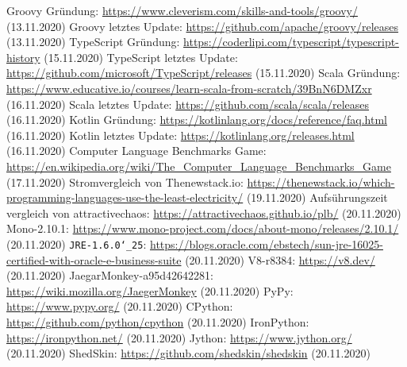 \documentclass[ngerman]{article}
\begin{document}
\begin{thebibliography}{9}
        Groovy Gründung: \url{https://www.cleverism.com/skills-and-tools/groovy/} (13.11.2020)
        Groovy letztes Update: \url{https://github.com/apache/groovy/releases} (13.11.2020)
        TypeScript Gründung: \url{https://coderlipi.com/typescript/typescript-history} (15.11.2020)
        TypeScript letztes Update: \url{https://github.com/microsoft/TypeScript/releases} (15.11.2020)
        Scala Gründung: \url{https://www.educative.io/courses/learn-scala-from-scratch/39BnN6DMZxr} (16.11.2020)
        Scala letztes Update: \url{https://github.com/scala/scala/releases} (16.11.2020)
        Kotlin Gründung: \url{https://kotlinlang.org/docs/reference/faq.html} (16.11.2020)
        Kotlin letztes Update: \url{https://kotlinlang.org/releases.html} (16.11.2020)
        Computer Language Benchmarks Game: \url{https://en.wikipedia.org/wiki/The_Computer_Language_Benchmarks_Game} (17.11.2020)
        Stromvergleich von Thenewstack.io: \url{https://thenewstack.io/which-programming-languages-use-the-least-electricity/} (19.11.2020)
        Aufsührungszeit vergleich von attractivechaos: \url{https://attractivechaos.github.io/plb/} (20.11.2020)
        Mono-2.10.1: \url{https://www.mono-project.com/docs/about-mono/releases/2.10.1/} (20.11.2020)
        \texttt{JRE-1.6.0\char`_25}: \url{https://blogs.oracle.com/ebstech/sun-jre-16025-certified-with-oracle-e-business-suite} (20.11.2020)
        V8-r8384: \url{https://v8.dev/} (20.11.2020)
        JaegarMonkey-a95d42642281: \url{https://wiki.mozilla.org/JaegerMonkey} (20.11.2020)
        PyPy: \url{https://www.pypy.org/} (20.11.2020)
        CPython: \url{https://github.com/python/cpython} (20.11.2020)
        IronPython: \url{https://ironpython.net/} (20.11.2020)
        Jython: \url{https://www.jython.org/} (20.11.2020)
        ShedSkin: \url{https://github.com/shedskin/shedskin} (20.11.2020)

\end{thebibliography}
\end{document}
